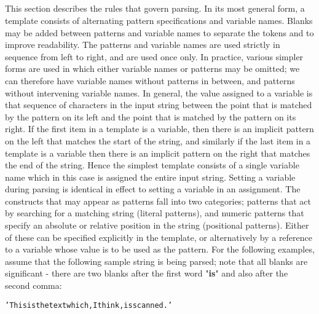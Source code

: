\subsection{}\label{}
 This section describes the rules that govern parsing.
 In its most general form, a template consists of alternating pattern
specifications and variable names.  Blanks may be added between
patterns and variable names to separate the tokens and to improve
readability.  The patterns and variable names are used strictly in
sequence from left to right, and are used once only.  In practice,
various simpler forms are used in which either variable names or
patterns may be omitted; we can therefore have variable names without
patterns in between, and patterns without intervening variable names.
 In general, the value assigned to a variable is that sequence of
characters in the input string between the point that is matched by the
pattern on its left and the point that is matched by the pattern on its
right.
 If the first item in a template is a variable, then there is an
implicit pattern on the left that matches the start of the string, and
similarly if the last item in a template is a variable then there is an
implicit pattern on the right that matches the end of the string.
Hence the simplest template consists of a single variable name which in
this case is assigned the entire input string.
 Setting a variable during parsing is identical in effect to setting a
variable in an assignment.
 The constructs that may appear as patterns fall into two categories;
patterns that act by searching for a matching string (literal
patterns), and numeric patterns that specify an absolute or relative
position in the string (positional patterns).
Either of these can be specified explicitly in the template, or
alternatively by a reference to a variable whose value is to be used
as the pattern.
 For the following examples, assume that the following sample string
is being parsed; note that all blanks are significant - there are
two blanks after the first word "\textbf{is}" and also after the
second comma:
\begin{alltt}
'This is  the text which, I think,  is scanned.'
\end{alltt}

